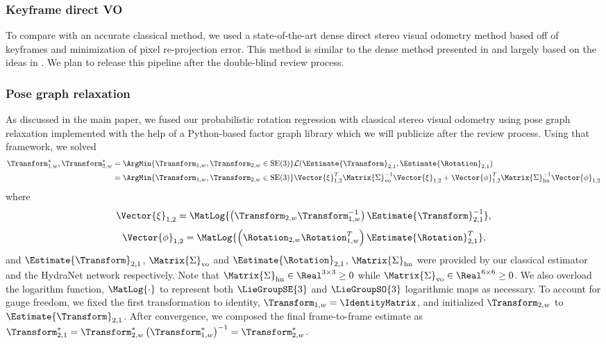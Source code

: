 \subsubsection{Keyframe direct VO}
To compare with an accurate classical method, we used a state-of-the-art dense direct stereo visual odometry method based off of keyframes and minimization of pixel re-projection error. This method is similar to the dense method presented in \cite{2018_Peretroukhin_Deep} and largely based on the ideas in \cite{engel2014lsd}. We plan to release this pipeline after the double-blind review process.

\subsubsection{Pose graph relaxation}

As discussed in the main paper, we fused our probabilistic rotation regression with classical stereo visual odometry using pose graph relaxation implemented with the help of a Python-based factor graph library which we will publicize after the review process. Using that framework, we solved
\begin{align}
	\Transform_{1,w}^*, \Transform_{2,w}^* &= \ArgMin{\Transform_{1,w}, \Transform_{2,w}\in\text{SE}(3)}\mathcal{L}(\Estimate{\Transform}_{2,1}, \Estimate{\Rotation}_{2,1}) \\ & = \ArgMin{\Transform_{1,w}, \Transform_{2,w}\in\text{SE}(3)} \Vector{\xi}_\text{1,2}^T \Matrix{\Sigma}^{-1}_\text{vo} \Vector{\xi}_\text{1,2} + \Vector{\phi}_\text{1,2}^T \Matrix{\Sigma}^{-1}_{\text{hn}} \Vector{\phi}_\text{1,2} 
\end{align}
where
\begin{equation}
	\Vector{\xi}_\text{1,2} =  \MatLog{\left(\Transform_{2,w} \Transform_{1,w}^{-1} \right)\Estimate{\Transform}_{2,1}^{-1}},
\end{equation}
\begin{equation}
	\Vector{\phi}_\text{1,2} =  \MatLog{\left(\Rotation_{2,w} \Rotation_{1,w}^{T} \right)\Estimate{\Rotation}_{2,1}^{T}},
\end{equation}
and $\Estimate{\Transform}_{2,1}$, $\Matrix{\Sigma}_\text{vo}$ and $\Estimate{\Rotation}_{2,1}$, $\Matrix{\Sigma}_{\text{hn}}$ were provided by our classical estimator and the HydraNet network respectively. Note that $\Matrix{\Sigma}_{\text{hn}} \in \Real^{3 \times 3} \geq 0$ while $\Matrix{\Sigma}_{\text{vo}} \in \Real^{6 \times 6} \geq 0 $. We also overload the logarithm function, $\MatLog{\cdot}$ to represent both $\LieGroupSE{3}$ and $\LieGroupSO{3}$ logarithmic maps as necessary. To account for gauge freedom, we fixed the first transformation to identity, $\Transform_{1,w} = \IdentityMatrix$, and initialized $\Transform_{2,w}$ to  $\Estimate{\Transform}_{2,1}$.  After convergence, we composed the final frame-to-frame estimate as $ \Transform_{2,1}^* =  \Transform_{2,w}^*  \left(\Transform_{1,w}^*\right)^{-1} = \Transform_{2,w}^*$.

